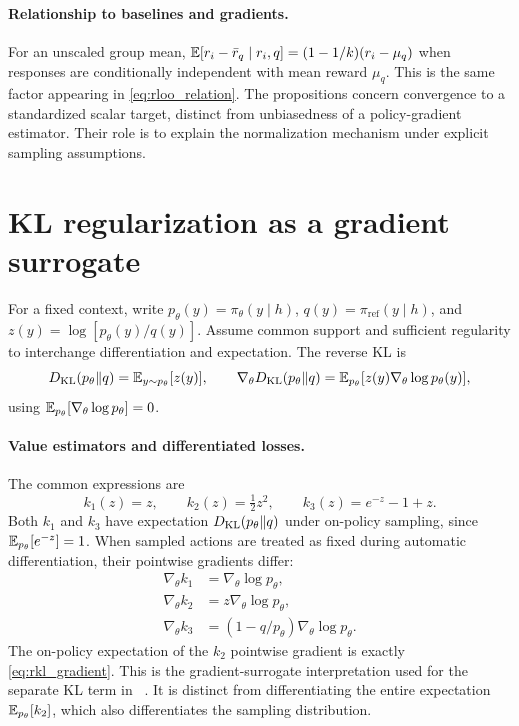 \paragraph{Relationship to baselines and gradients.}
For an unscaled group mean, $\mathbb{E}[r_i-\bar r_q\mid r_i,q]=(1-1/k)(r_i-\mu_q)$ when responses are conditionally independent with mean reward $\mu_q$. This is the same factor appearing in \cref{eq:rloo_relation}. The propositions concern convergence to a standardized scalar target, distinct from unbiasedness of a policy-gradient estimator. Their role is to explain the normalization mechanism under explicit sampling assumptions.

\clearpage
\section{KL regularization as a gradient surrogate}\label{appendix:kl}
For a fixed context, write $p_\theta(y)=\pi_\theta(y\mid h)$, $q(y)=\pi_{\mathrm{ref}}(y\mid h)$, and $z(y)=\log[p_\theta(y)/q(y)]$. Assume common support and sufficient regularity to interchange differentiation and expectation. The reverse KL is
\begin{equation}
 D_{\mathrm{KL}}(p_\theta\|q)=\mathbb{E}_{y\sim p_\theta}[z(y)],
 \qquad
 \nabla_\theta D_{\mathrm{KL}}(p_\theta\|q)
 =\mathbb{E}_{p_\theta}[z(y)\nabla_\theta\log p_\theta(y)],
 \label{eq:rkl_gradient}
\end{equation}
using $\mathbb{E}_{p_\theta}[\nabla_\theta\log p_\theta]=0$.

\paragraph{Value estimators and differentiated losses.}
The common expressions are
\begin{equation}
 k_1(z)=z,\qquad k_2(z)=\tfrac12 z^2,\qquad k_3(z)=e^{-z}-1+z.
\end{equation}
Both $k_1$ and $k_3$ have expectation $D_{\mathrm{KL}}(p_\theta\|q)$ under on-policy sampling, since $\mathbb{E}_{p_\theta}[e^{-z}]=1$. When sampled actions are treated as fixed during automatic differentiation, their pointwise gradients differ:
\begin{equation}
\begin{aligned}
 \nabla_\theta k_1 &=\nabla_\theta\log p_\theta,\\
 \nabla_\theta k_2 &=z\nabla_\theta\log p_\theta,\\
 \nabla_\theta k_3 &=(1-q/p_\theta)\nabla_\theta\log p_\theta.
\end{aligned}
\label{eq:kl_pointwise}
\end{equation}
The on-policy expectation of the $k_2$ pointwise gradient is exactly \cref{eq:rkl_gradient}. This is the gradient-surrogate interpretation used for the separate KL term in \baseline~\citep{liu2025rethinking}. It is distinct from differentiating the entire expectation $\mathbb{E}_{p_\theta}[k_2]$, which also differentiates the sampling distribution.

